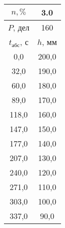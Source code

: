 \begin{tabular}[t]{|c|c|}
\hline
$n, \%$ & 3.0 \\
\hline
$P$, дел & 160 \\
\hline
$t_{абс}$, с & $h$, мм \\ 
\hline
0,0 & 200,0 \\ 
32,0 & 190,0 \\ 
60,0 & 180,0 \\ 
89,0 & 170,0 \\ 
118,0 & 160,0 \\ 
147,0 & 150,0 \\ 
177,0 & 140,0 \\ 
207,0 & 130,0 \\ 
240,0 & 120,0 \\ 
271,0 & 110,0 \\ 
303,0 & 100,0 \\ 
337,0 & 90,0 \\ 
\hline
\end{tabular}